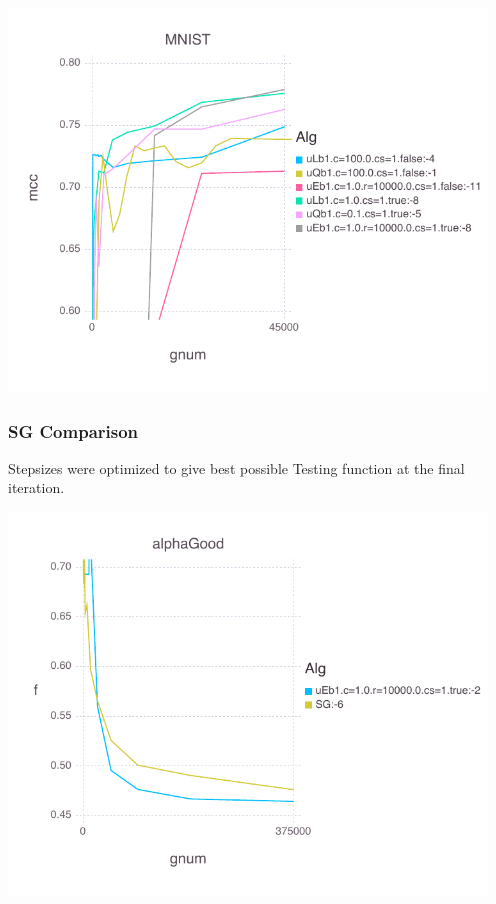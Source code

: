 \documentclass[11pt]{article}
\begin{document}
   \includegraphics[width= 5in]{Figures/MNISTBLtruemccInitialHeuristics.pdf}
   
   \newpage
  
   \subsubsection{SG Comparison}
   
   Stepsizes were optimized to give best possible Testing function at the final iteration.

   \includegraphics[width= 5in]{Figures/alphaGoodBLtruefWithSGglobal.pdf}
  
\end{document}
